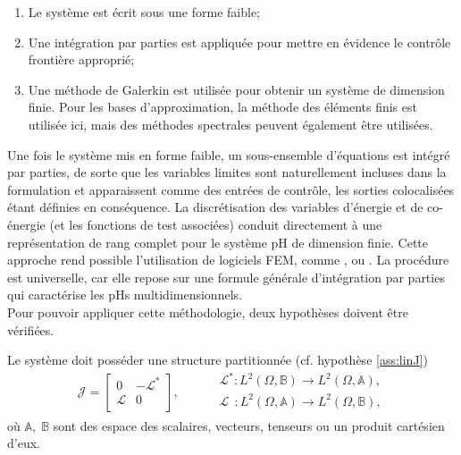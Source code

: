 \begin{enumerate}
\item Le système est écrit sous une forme faible;
\item Une intégration par parties est appliquée pour mettre en évidence le contrôle frontière approprié;
\item Une méthode de Galerkin est utilisée pour obtenir un système de dimension finie. Pour les bases d'approximation, la méthode des éléments finis est utilisée ici, mais des méthodes spectrales peuvent également être utilisées.
\end{enumerate}

Une fois le système mis en forme faible, un sous-ensemble d'équations est intégré par parties, de sorte que les variables limites sont naturellement incluses dans la formulation et apparaissent comme des entrées de contrôle, les sorties colocalisées étant définies en conséquence. La discrétisation des variables d'énergie et de co-énergie (et les fonctions de test associées) conduit directement à une représentation de rang complet pour le système pH de dimension finie. Cette approche rend possible l'utilisation de logiciels FEM, comme \fenics \cite{logg2012}, ou \firedrake \cite{rathgeber2017firedrake}. La procédure est universelle, car elle repose sur une formule générale d'intégration par parties qui caractérise les pHs multidimensionnels. \\

Pour pouvoir appliquer cette méthodologie, deux hypothèses doivent être vérifiées. 
\begin{hypothese}\label{ass:linJ_fr}
Le système doit posséder une structure partitionnée (cf. hypothèse \ref{ass:linJ})
\begin{equation*}
\mathcal{J} = 
\begin{bmatrix}
0 & -\mathcal{L}^* \\
\mathcal{L} & 0 \\
\end{bmatrix}, \qquad 
\begin{aligned}
&\mathcal{L}^* : L^2(\Omega, \mathbb{B}) \rightarrow L^2(\Omega, \mathbb{A}), \\
&\mathcal{L}\;\, : L^2(\Omega, \mathbb{A}) \rightarrow L^2(\Omega, \mathbb{B}), \\
\end{aligned}
\end{equation*}
où $\mathbb{A}, \; \mathbb{B}$ sont des espace des scalaires, vecteurs, tenseurs ou un produit cartésien d'eux. 
\end{hypothese}

